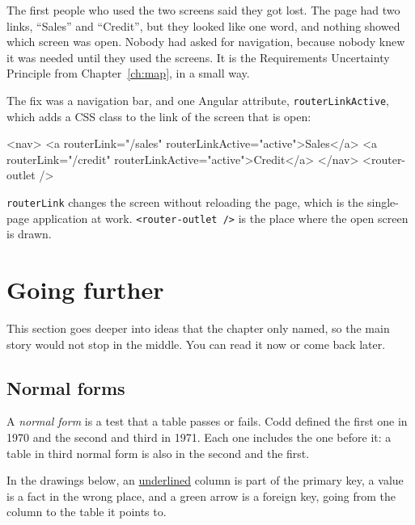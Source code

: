 The first people who used the two screens said they got lost. The page had
two links, ``Sales'' and ``Credit'', but they looked like one word, and
nothing showed which screen was open. Nobody had asked for navigation,
because nobody knew it was needed until they used the screens. It is the
Requirements Uncertainty Principle from Chapter~\ref{ch:map}, in a small
way.

The fix was a navigation bar, and one Angular attribute,
\texttt{routerLinkActive}, which adds a CSS class to the link of the screen
that is open:

\begin{code}[language=HTML]
<nav>
  <a routerLink="/sales" routerLinkActive="active">Sales</a>
  <a routerLink="/credit" routerLinkActive="active">Credit</a>
</nav>
<router-outlet />
\end{code}

\texttt{routerLink} changes the screen without reloading the page, which is
the single-page application at work. \texttt{<router-outlet />} is the place
where the open screen is drawn.

\section{Going further}
\label{sec:two-further}

This section goes deeper into ideas that the chapter only named, so the main
story would not stop in the middle. You can read it now or come back later.

\subsection*{Normal forms}

A \emph{normal form} is a test that a table passes or fails. Codd defined the
first one in 1970 and the second and third in 1971. Each one includes the one
before it: a table in third normal form is also in the second and the first.

In the drawings below, an \underline{underlined} column is part of the
primary key, a  value is a fact in the wrong place, and a green
arrow is a foreign key, going from the column to the table it points to.

